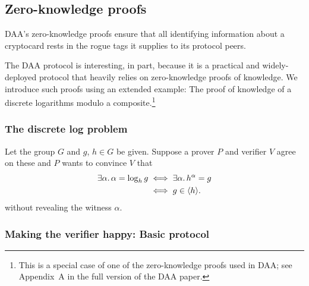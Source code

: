 \subsection{Zero-knowledge proofs}

\begin{comment}
	\emph{PDS:}
	Security property:  Unforgeability (by reduction to the
	flexible RSA problem).

	Alleged security properties: Satistical witness
	indistinguishable and soundness (by reduction to the flexible
	RSA problem in the random oracle model).
\end{comment}

DAA's zero-knowledge proofs ensure that all identifying information
about a cryptocard rests in the rogue tags it supplies to its protocol peers.

The DAA protocol is interesting, in part, because it is a practical
and widely-deployed protocol that heavily relies on zero-knowledge
proofs of knowledge.
We introduce such proofs using an extended example: The
proof of knowledge of a discrete logarithms modulo a
composite.\footnote{%
	This is a special case of one of the zero-knowledge proofs used in DAA;
	see Appendix~A in the full version of the DAA paper.}

\subsubsection{The discrete log problem}

\newcommand{\ciff}{\mathrel{\phantom{\iff}}}

Let the group $G$ and $g$, $h \in G$ be given.
Suppose a prover $P$ and
verifier $V$ agree on these and $P$ wants to convince $V$ that
\begin{align*}
\exists \alpha.\, \alpha = \log_h g &\iff \exists \alpha.\, h^\alpha = g \\
	&\iff g \in \langle{h}\rangle.
\end{align*}
without revealing the witness $\alpha$.

\subsubsection{Making the verifier happy: Basic protocol}

\newcommand{\sset}[1]{\left\{#1\right\}}

